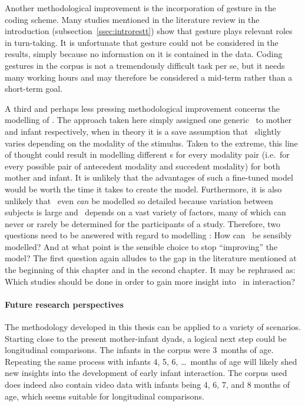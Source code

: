 Another methodological improvement is the incorporation of gesture in the coding scheme.
Many studies mentioned in the literature review in the introduction (subsection~\ref{ssec:introrestt}) show that gesture plays relevant roles in turn-taking.
It is unfortunate that gesture could not be considered in the results, simply because no information on it is contained in the data.
Coding gestures in the corpus is not a tremendously difficult task per se, but it needs many working hours and may therefore be considered a mid-term rather than a short-term goal.

A third and perhaps less pressing methodological improvement concerns the modelling of \rt.
The approach taken here simply assigned one generic \rt\ to mother and infant respectively, when in theory it is a save assumption that \rt\ slightly varies depending on the modality of the stimulus.
Taken to the extreme, this line of thought could result in modelling different \rt s for every modality pair (i.e.~for every possible pair of antecedent modality and succedent modality) for both mother and infant.
It is unlikely that the advantages of such a fine-tuned model would be worth the time it takes to create the model.
Furthermore, it is also unlikely that \rt\ even \emph{can} be modelled so detailed because variation between subjects is large and \rt\ depends on a vast variety of factors, many of which can never or rarely be determined for the participants of a study.
Therefore, two questions need to be answered with regard to modelling \rt:
How can \rt\ be sensibly modelled?
And at what point is the sensible choice to stop ``improving'' the model?
The first question again alludes to the gap in the literature mentioned at the beginning of this chapter and in the second chapter.
It may be rephrased as:
Which studies should be done in order to gain more insight into \rt\ in interaction?

\paragraph{Future research perspectives}
The methodology developed in this thesis can be applied to a variety of scenarios.
Starting close to the present mother-infant dyads, a logical next step could be longitudinal comparisons.
The infants in the corpus were 3~months of age.
Repeating the same process with infants 4, 5, 6, \ldots\ months of age will likely shed new insights into the development of early infant interaction.
The corpus used does indeed also contain video data with infants being 4, 6, 7, and 8 months of age, which seems suitable for longitudinal comparisons.

